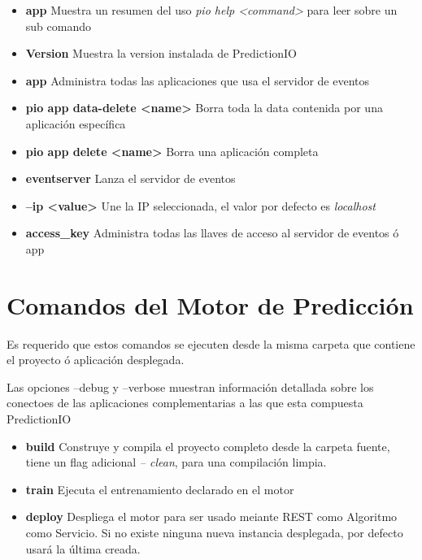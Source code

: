\begin{itemize}
	\item \textbf{app} Muestra un resumen del uso  \emph{pio help <command>} para leer sobre un sub comando
	
	\item \textbf{Version} Muestra la version instalada de PredictionIO
	
	
	\item \textbf{app }  Administra todas las aplicaciones que usa el servidor de eventos
	\item \textbf{pio app data-delete <name> } Borra toda la data contenida por una aplicación específica
	\item \textbf{pio app delete <name> }  Borra una aplicación completa
	\item \textbf{eventserver }  Lanza el servidor de eventos
	\item \textbf{ --ip <value> } Une la IP seleccionada, el valor por defecto es \emph{localhost}
	\item \textbf{access\_key} Administra todas las llaves de acceso al servidor de eventos ó app
	
\end{itemize}


\section {Comandos del Motor de Predicción}

Es requerido que estos comandos se ejecuten desde la misma carpeta que contiene el proyecto ó aplicación desplegada.

Las opciones  --debug y --verbose  muestran información detallada sobre los conectoes de las aplicaciones complementarias a las que esta compuesta PredictionIO

\begin{itemize}
	\item \textbf{build} Construye y compila el proyecto completo desde la carpeta fuente, tiene un flag adicional \emph{-- clean}, para una compilación limpia.

	\item \textbf{train} Ejecuta el entrenamiento declarado en el motor 

	\item \textbf{deploy} Despliega el motor para ser usado meiante REST como Algoritmo como Servicio. Si no existe ninguna nueva instancia  desplegada, por defecto usará la última creada.
	
\end{itemize}


